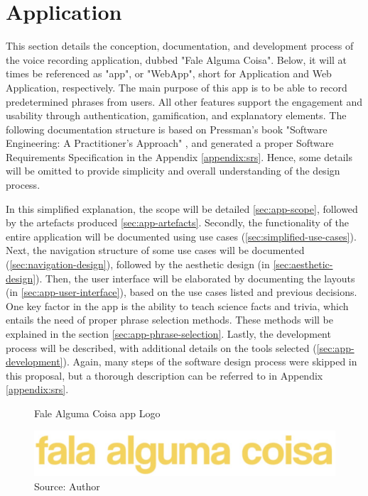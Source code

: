 \chapter{Application}
\label{chap:proposal-application}

This section details the conception, documentation, and development process of the voice recording application, dubbed "Fale Alguma Coisa". Below, it will at times be referenced as "app", or "WebApp", short for Application and Web Application, respectively. The main purpose of this app is to be able to record predetermined phrases from users. All other features support the engagement and usability through authentication, gamification, and explanatory elements. The following documentation structure is based on Pressman's book "Software Engineering: A Practitioner's Approach" \cite{pressman2014software}, and generated a proper Software Requirements Specification in the Appendix \ref{appendix:srs}. Hence, some details will be omitted to provide simplicity and overall understanding of the design process.

In this simplified explanation, the scope will be detailed \ref{sec:app-scope}, followed by the artefacts produced \ref{sec:app-artefacts}. Secondly, the functionality of the entire application will be documented using use cases (\ref{sec:simplified-use-cases}). Next, the navigation structure of some use cases will be documented (\ref{sec:navigation-design}), followed by the aesthetic design (in \ref{sec:aesthetic-design}). Then, the user interface will be elaborated by documenting the layouts (in \ref{sec:app-user-interface}), based on the use cases listed and previous decisions. One key factor in the app is the ability to teach science facts and trivia, which entails the need of proper phrase selection methods. These methods will be explained in the section \ref{sec:app-phrase-selection}. Lastly, the development process will be described, with additional details on the tools selected (\ref{sec:app-development}). Again, many steps of the software design process were skipped in this proposal, but a thorough description can be referred to in Appendix \ref{appendix:srs}.

\begin{figure}[ht]
    \centering
    \caption{Fale Alguma Coisa app Logo}
     \includegraphics[width=\linewidth/2]{images/app/logo.jpg}
    \caption*{Source: Author}
    \label{fig:falealgumacoisa-logo}
\end{figure}

